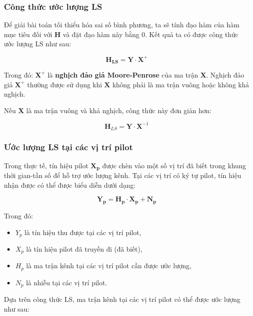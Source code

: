 \subsubsection{Công thức ước lượng LS}

Để giải bài toán tối thiểu hóa sai số bình phương, ta sẽ tính đạo hàm của hàm mục tiêu đối với $\bm{H}$ và đặt đạo hàm này bằng 0. Kết quả ta có được công thức ước lượng LS như sau:

\begin{equation}
    \bm{H_{LS}} = \bm{Y} \cdot \bm{X}^{+}
\end{equation}

Trong đó: \( \bm{X}^{+} \) là \textbf{nghịch đảo giả Moore-Penrose} của ma trận \( \bm{X} \). 
Nghịch đảo giả \( \bm{X}^{+} \) thường được sử dụng khi \( \bm{X} \) không phải là ma trận vuông hoặc không khả nghịch.

Nếu $\bm{X}$ là ma trận vuông và khả nghịch, công thức này đơn giản hơn:

\begin{equation}
    \bm{H}_{LS} = \bm{Y} \cdot \bm{X}^{-1}
\end{equation}

\subsubsection{Ước lượng LS tại các vị trí pilot}

Trong thực tế, tín hiệu pilot \( \bm{X_p} \) được chèn vào một số vị trí đã biết trong khung thời gian-tần số để hỗ trợ ước lượng kênh. 
Tại các vị trí có ký tự pilot, tín hiệu nhận được có thể được biểu diễn dưới dạng:

\begin{equation}
    \bm{Y_p} = \bm{H_p} \cdot \bm{X_p} + \bm{N_p}
\end{equation}

Trong đó:
\begin{itemize}
    \item \( Y_p \) là tín hiệu thu được tại các vị trí pilot,
    \item \( X_p \) là tín hiệu pilot đã truyền đi (đã biết),
    \item \( H_p \) là ma trận kênh tại các vị trí pilot cần được ước lượng,
    \item \( N_p \) là nhiễu tại các vị trí pilot.
\end{itemize}

Dựa trên công thức LS, ma trận kênh tại các vị trí pilot có thể được ước lượng như sau:


